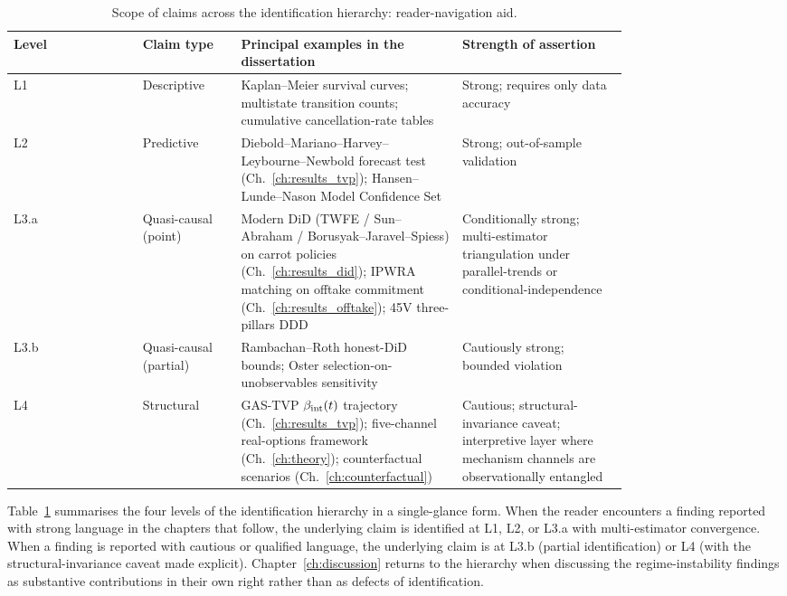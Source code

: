 \begin{table}[!htbp]
\centering
\caption{Scope of claims across the identification hierarchy: reader-navigation aid.}
\label{tab:ch1-scope-of-claims}
\small
\begin{tabular}{@{}lp{0.16\linewidth}p{0.36\linewidth}p{0.27\linewidth}@{}}
\toprule
Level & Claim type & Principal examples in the dissertation & Strength of assertion \\
\midrule
L1   & Descriptive            & Kaplan--Meier survival curves; multistate transition counts; cumulative cancellation-rate tables                                                                                          & Strong; requires only data accuracy \\[2pt]
L2   & Predictive             & Diebold--Mariano--Harvey--Leybourne--Newbold forecast test (Ch.~\ref{ch:results_tvp}); Hansen--Lunde--Nason Model Confidence Set                                                          & Strong; out-of-sample validation \\[2pt]
L3.a & Quasi-causal (point)   & Modern DiD (TWFE / Sun--Abraham / Borusyak--Jaravel--Spiess) on carrot policies (Ch.~\ref{ch:results_did}); IPWRA matching on offtake commitment (Ch.~\ref{ch:results_offtake}); 45V three-pillars DDD                                  & Conditionally strong; multi-estimator triangulation under parallel-trends or conditional-independence \\[2pt]
L3.b & Quasi-causal (partial) & Rambachan--Roth honest-DiD bounds; Oster selection-on-unobservables sensitivity                                                                                                            & Cautiously strong; bounded violation \\[2pt]
L4   & Structural             & GAS-TVP $\beta_{\mathrm{int}}(t)$ trajectory (Ch.~\ref{ch:results_tvp}); five-channel real-options framework (Ch.~\ref{ch:theory}); counterfactual scenarios (Ch.~\ref{ch:counterfactual}) & Cautious; structural-invariance caveat; interpretive layer where mechanism channels are observationally entangled \\
\bottomrule
\end{tabular}
\end{table}

Table~\ref{tab:ch1-scope-of-claims} summarises the four levels of the identification hierarchy in a single-glance form. When the reader encounters a finding reported with strong language in the chapters that follow, the underlying claim is identified at L1, L2, or L3.a with multi-estimator convergence. When a finding is reported with cautious or qualified language, the underlying claim is at L3.b (partial identification) or L4 (with the structural-invariance caveat made explicit). Chapter~\ref{ch:discussion} returns to the hierarchy when discussing the regime-instability findings as substantive contributions in their own right rather than as defects of identification.

